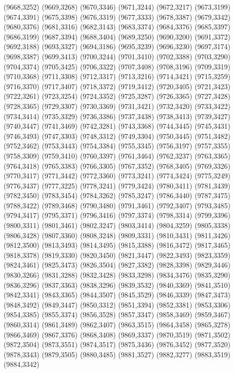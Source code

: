 (9668,3252)
(9669,3268)
(9670,3346)
(9671,3244)
(9672,3217)
(9673,3199)
(9674,3391)
(9675,3398)
(9676,3319)
(9677,3333)
(9678,3387)
(9679,3342)
(9680,3376)
(9681,3316)
(9682,3143)
(9683,3374)
(9684,3376)
(9685,3397)
(9686,3199)
(9687,3394)
(9688,3404)
(9689,3250)
(9690,3200)
(9691,3372)
(9692,3188)
(9693,3327)
(9694,3186)
(9695,3239)
(9696,3230)
(9697,3174)
(9698,3387)
(9699,3413)
(9700,3244)
(9701,3410)
(9702,3388)
(9703,3290)
(9704,3374)
(9705,3425)
(9706,3322)
(9707,3408)
(9708,3196)
(9709,3319)
(9710,3368)
(9711,3308)
(9712,3317)
(9713,3216)
(9714,3421)
(9715,3259)
(9716,3370)
(9717,3407)
(9718,3372)
(9719,3412)
(9720,3405)
(9721,3423)
(9722,3261)
(9723,3254)
(9724,3352)
(9725,3287)
(9726,3365)
(9727,3428)
(9728,3365)
(9729,3307)
(9730,3369)
(9731,3421)
(9732,3420)
(9733,3422)
(9734,3414)
(9735,3329)
(9736,3386)
(9737,3438)
(9738,3413)
(9739,3427)
(9740,3447)
(9741,3469)
(9742,3281)
(9743,3368)
(9744,3445)
(9745,3431)
(9746,3493)
(9747,3303)
(9748,3312)
(9749,3304)
(9750,3445)
(9751,3482)
(9752,3462)
(9753,3443)
(9754,3384)
(9755,3345)
(9756,3197)
(9757,3355)
(9758,3309)
(9759,3410)
(9760,3397)
(9761,3464)
(9762,3237)
(9763,3365)
(9764,3418)
(9765,3383)
(9766,3305)
(9767,3352)
(9768,3405)
(9769,3326)
(9770,3417)
(9771,3442)
(9772,3360)
(9773,3241)
(9774,3424)
(9775,3249)
(9776,3437)
(9777,3225)
(9778,3241)
(9779,3424)
(9780,3411)
(9781,3439)
(9782,3450)
(9783,3454)
(9784,3262)
(9785,3247)
(9786,3440)
(9787,3475)
(9788,3422)
(9789,3468)
(9790,3480)
(9791,3461)
(9792,3407)
(9793,3485)
(9794,3417)
(9795,3371)
(9796,3416)
(9797,3374)
(9798,3314)
(9799,3396)
(9800,3311)
(9801,3461)
(9802,3247)
(9803,3414)
(9804,3259)
(9805,3338)
(9806,3428)
(9807,3360)
(9808,3248)
(9809,3331)
(9810,3431)
(9811,3426)
(9812,3500)
(9813,3493)
(9814,3495)
(9815,3388)
(9816,3472)
(9817,3465)
(9818,3378)
(9819,3330)
(9820,3450)
(9821,3447)
(9822,3493)
(9823,3359)
(9824,3461)
(9825,3473)
(9826,3504)
(9827,3382)
(9828,3398)
(9829,3446)
(9830,3266)
(9831,3288)
(9832,3428)
(9833,3298)
(9834,3476)
(9835,3290)
(9836,3296)
(9837,3363)
(9838,3296)
(9839,3532)
(9840,3369)
(9841,3510)
(9842,3341)
(9843,3365)
(9844,3507)
(9845,3529)
(9846,3339)
(9847,3473)
(9848,3492)
(9849,3447)
(9850,3312)
(9851,3394)
(9852,3381)
(9853,3306)
(9854,3385)
(9855,3374)
(9856,3528)
(9857,3347)
(9858,3469)
(9859,3467)
(9860,3314)
(9861,3489)
(9862,3407)
(9863,3515)
(9864,3458)
(9865,3278)
(9866,3469)
(9867,3376)
(9868,3408)
(9869,3337)
(9870,3519)
(9871,3502)
(9872,3504)
(9873,3551)
(9874,3517)
(9875,3436)
(9876,3452)
(9877,3520)
(9878,3343)
(9879,3505)
(9880,3485)
(9881,3527)
(9882,3277)
(9883,3519)
(9884,3342)
